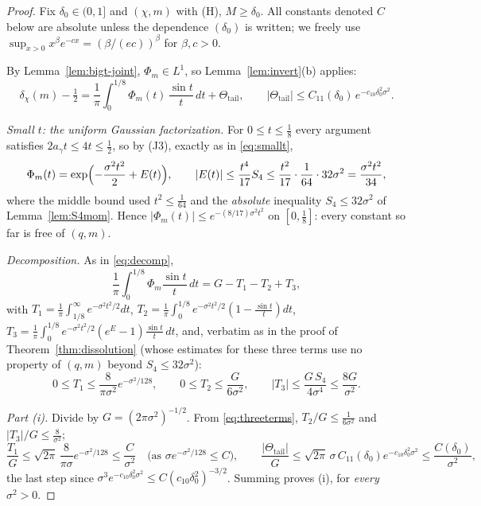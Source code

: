 \begin{proof}
Fix $\delta_0\in(0,1]$ and $(\chi,m)$ with (H), $M\ge\delta_0$. All
constants denoted $C$ below are absolute unless the dependence
$(\delta_0)$ is written; we freely use
$\sup_{x>0}x^{\beta}e^{-cx}=(\beta/(ec))^{\beta}$ for $\beta,c>0$.

By Lemma~\ref{lem:bigt-joint}, $\Phi_m\in L^1$, so
Lemma~\ref{lem:invert}(b) applies:
\begin{equation}\label{eq:GPq}
\delta_\chi(m)-\tfrac12
=\frac1\pi\int_0^{1/8}\Phi_m(t)\,\frac{\sin t}t\,dt
+\Theta_{\mathrm{tail}},
\qquad
|\Theta_{\mathrm{tail}}|\le
C_{11}(\delta_0)\,e^{-c_{10}\delta_0^2\sigma^2}.
\end{equation}

\emph{Small $t$: the uniform Gaussian factorization.} For
$0\le t\le\tfrac18$ every argument satisfies $2a_\gamma t\le4t\le
\tfrac12$, so by (J3), exactly as in \eqref{eq:smallt},
\[
\Phi_m(t)=\exp\Bigl(-\frac{\sigma^2t^2}2+E(t)\Bigr),
\qquad
|E(t)|\le\frac{t^4}{17}S_4
\le\frac{t^2}{17}\cdot\frac{1}{64}\cdot32\sigma^2
=\frac{\sigma^2t^2}{34},
\]
where the middle bound used $t^2\le\tfrac1{64}$ and the
\emph{absolute} inequality $S_4\le32\sigma^2$ of
Lemma~\ref{lem:S4mom}. Hence
$|\Phi_m(t)|\le e^{-(8/17)\sigma^2t^2}$ on $[0,\tfrac18]$: every
constant so far is free of $(q,m)$.

\emph{Decomposition.} As in \eqref{eq:decomp},
\[
\frac1\pi\int_0^{1/8}\Phi_m\frac{\sin t}t\,dt=G-T_1-T_2+T_3,
\]
with $T_1=\frac1\pi\int_{1/8}^\infty e^{-\sigma^2t^2/2}dt$,
$T_2=\frac1\pi\int_0^{1/8}e^{-\sigma^2t^2/2}(1-\tfrac{\sin t}t)dt$,
$T_3=\frac1\pi\int_0^{1/8}e^{-\sigma^2t^2/2}(e^{E}-1)\tfrac{\sin t}t\,dt$,
and, verbatim as in the proof of Theorem~\ref{thm:dissolution} (whose
estimates for these three terms use no property of $(q,m)$ beyond
$S_4\le32\sigma^2$):
\begin{equation}\label{eq:threeterms}
0\le T_1\le\frac{8}{\pi\sigma^2}e^{-\sigma^2/128},
\qquad
0\le T_2\le\frac{G}{6\sigma^2},
\qquad
|T_3|\le\frac{G\,S_4}{4\sigma^4}\le\frac{8G}{\sigma^2}.
\end{equation}

\emph{Part (i).} Divide by $G=(2\pi\sigma^2)^{-1/2}$. From
\eqref{eq:threeterms},
$T_2/G\le\tfrac1{6\sigma^2}$ and $|T_3|/G\le\tfrac8{\sigma^2}$;
\[
\frac{T_1}{G}\le\sqrt{2\pi}\,\frac{8}{\pi\sigma}e^{-\sigma^2/128}
\le\frac{C}{\sigma^{2}}
\quad\text{(as }\sigma e^{-\sigma^2/128}\le C\text{)},
\qquad
\frac{|\Theta_{\mathrm{tail}}|}{G}
\le\sqrt{2\pi}\,\sigma\,C_{11}(\delta_0)e^{-c_{10}\delta_0^2\sigma^2}
\le\frac{C(\delta_0)}{\sigma^{2}},
\]
the last step since
$\sigma^{3}e^{-c_{10}\delta_0^2\sigma^2}\le C(c_{10}\delta_0^2)^{-3/2}$.
Summing proves (i), for \emph{every} $\sigma^2>0$.


\end{proof}
